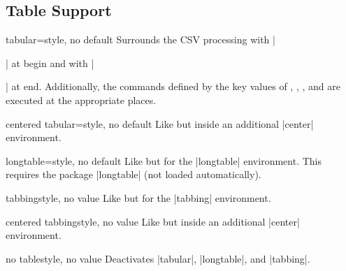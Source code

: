 \documentclass[a4paper,11pt]{ltxdoc}
\begin{document}


\clearpage
\subsection{Table Support}\label{subsec:tabsupport}%

\begin{docCsvKey}{tabular}{=}{style, no default}
  Surrounds the CSV processing with |\begin{tabular}|
  at begin and with |\end{tabular}| at end.
Additionally, the commands defined by the key values of
  , , ,
  and  are executed at the appropriate places.
\end{docCsvKey}


\begin{docCsvKey}{centered tabular}{=}{style, no default}
  Like  but inside an additional |center| environment.
\end{docCsvKey}


\begin{docCsvKey}{longtable}{=}{style, no default}
  Like  but for the |longtable| environment.
  This requires the package |longtable| (not loaded automatically).
\end{docCsvKey}


\begin{docCsvKey}{tabbing}{}{style, no value}
  Like  but for the |tabbing| environment.
\end{docCsvKey}


\begin{docCsvKey}{centered tabbing}{}{style, no value}
  Like  but inside an additional |center| environment.
\end{docCsvKey}


\begin{docCsvKey}{no table}{}{style, no value}
  Deactivates |tabular|, |longtable|, and |tabbing|.
\end{docCsvKey}


\end{document}
